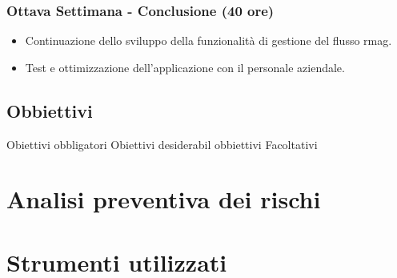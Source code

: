 \subsubsection*{Ottava Settimana - Conclusione (40 ore)}
\begin{itemize}
    \item Continuazione dello sviluppo della funzionalità di gestione del flusso \gls{rmag}\glox.
    \item Test e ottimizzazione dell'applicazione con il personale aziendale.
\end{itemize}

\subsection{Obbiettivi}
Obiettivi obbligatori
Obiettivi desiderabil
obbiettivi Facoltativi

\section{Analisi preventiva dei rischi}

\section{Strumenti utilizzati}

\newpage